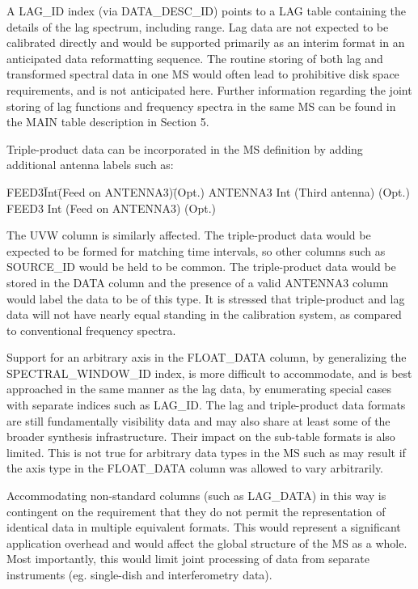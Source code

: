\documentclass{article}
\begin{document}
A LAG\_ID index (via DATA\_DESC\_ID) points to a LAG table containing
the details of the lag spectrum, including range. Lag data are not
expected to be calibrated directly and would be supported primarily as
an interim format in an anticipated data reformatting sequence. The
routine storing of both lag and transformed spectral data in one MS
would often lead to prohibitive disk space requirements, and is not
anticipated here. Further information regarding the joint storing of
lag functions and frequency spectra in the same MS can be found in the
MAIN table description in Section 5.

Triple-product data can be incorporated in the MS definition by adding
additional antenna labels such as:

\begin{tabbing}
FEED3\quad\quad\quad\quad  \= Int\quad\quad  \=
(Feed on ANTENNA3)\quad\quad \= (Opt.)\quad\quad \kill
ANTENNA3 \> Int \> (Third antenna) \> (Opt.) \\
FEED3    \> Int  \> (Feed on ANTENNA3) \> (Opt.) \\
\end{tabbing}

The UVW column is similarly affected. The triple-product data would
be expected to be formed for matching time intervals, so other columns
such as SOURCE\_ID would be held to be common. The triple-product data
would be stored in the DATA column and the presence of a valid
ANTENNA3 column would label the data to be of this type. It is
stressed that triple-product and lag data will not have nearly equal
standing in the calibration system, as compared to conventional
frequency spectra.

Support for an arbitrary axis in the FLOAT\_DATA column, by
generalizing the SPECTRAL\_WINDOW\_ID index, is more difficult to
accommodate, and is best approached in the same manner as the lag
data, by enumerating special cases with separate indices such as
LAG\_ID. The lag and triple-product data formats are still
fundamentally visibility data and may also share at least some of the
broader synthesis infrastructure. Their impact on the sub-table
formats is also limited. This is not true for arbitrary data types in
the MS such as may result if the axis type in the FLOAT\_DATA
column was allowed to vary arbitrarily. 

 Accommodating non-standard columns (such as LAG\_DATA) in this way is
contingent on the requirement that they do not permit the
representation of identical data in multiple equivalent formats. This
would represent a significant application overhead and would affect
the global structure of the MS as a whole. Most importantly, this
would limit joint processing of data from separate instruments
(eg. single-dish and interferometry data).
\end{document}
